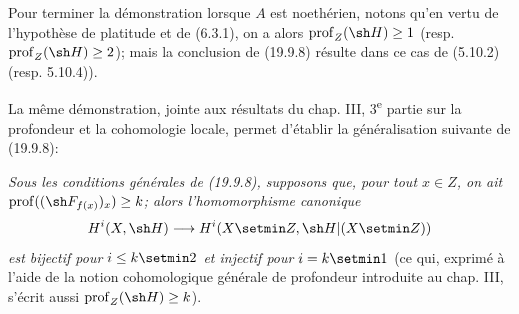 Pour terminer la démonstration lorsque $A$ est noethérien, notons qu'en vertu de l'hypothèse de platitude et de (6.3.1), on a alors $\operatorname{prof}_Z(\sh H)\geq1$ (resp. $\operatorname{prof}_Z(\sh H)\geq2$); mais la conclusion de (19.9.8) résulte dans ce cas de (5.10.2) (resp. 5.10.4)).

\begin{remark}[19.9.9]
\label{IV.19.9.9}
La même démonstration, jointe aux résultats du chap. III, 3\textsuperscript{e} partie sur la profondeur et la cohomologie locale, permet d'établir la généralisation suivante de (19.9.8):

\emph{Sous les conditions générales de \textup{(19.9.8)}, supposons que, pour tout $x\in Z$, on ait $\operatorname{prof}((\sh F_{f(x)})_x)\geq k$; alors l'homomorphisme canonique}
\[
  H^i(X,\sh H)\longrightarrow H^i(X\setmin Z,\sh H|(X\setmin Z))
\]
\emph{est bijectif pour $i\leq k\setmin 2$ et injectif pour $i=k\setmin 1$} (ce qui, exprimé à l'aide de la notion cohomologique générale de profondeur introduite au chap. III, s'écrit aussi $\operatorname{prof}_Z(\sh H)\geq k$).
\end{remark}
